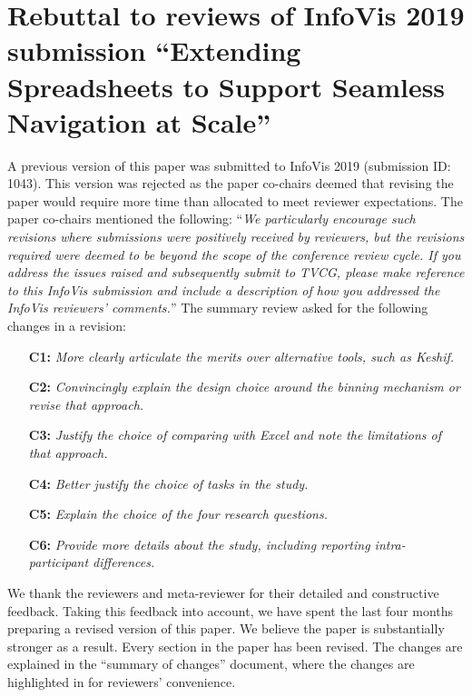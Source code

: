 
\section*{Rebuttal to reviews of InfoVis 2019 submission ``Extending Spreadsheets to Support Seamless
Navigation at Scale''}

A previous version of this paper was submitted to InfoVis 2019 (submission ID: 1043). This version was rejected as the paper co-chairs deemed that revising the paper would require more time than allocated to meet reviewer expectations. The paper co-chairs mentioned the following: ``\textit{We particularly encourage such revisions where submissions were positively received by reviewers, but the revisions required were deemed to be beyond the scope of the conference review cycle. If you address the issues raised and subsequently submit to TVCG, please make reference to this InfoVis submission and include a description of how you addressed the InfoVis reviewers' comments.}'' 
The summary review asked for the following changes in a revision:
\begin{itemize}
    \item[\textbf{C1:}] {\em More clearly articulate the merits over alternative tools, such as Keshif.} 
     \item[\textbf{C2:}] {\em Convincingly explain the design choice around the binning mechanism or revise
    that approach.}
    \item[\textbf{C3:}] {\em Justify the choice of comparing with Excel and note the limitations of that
    approach.}
     \item[\textbf{C4:}] {\em Better justify the choice of tasks in the study.} 
     \item[\textbf{C5:}]{\em Explain the choice of the four research questions.}
     \item[\textbf{C6:}] {\em Provide more details about the study, including reporting intra-participant
    differences.}
\end{itemize} 
We thank the reviewers and meta-reviewer for their detailed and
constructive feedback.
Taking this feedback into account, 
we have spent the last four months 
preparing a revised version of this paper.
We believe the paper is substantially
stronger as a result. 
Every section in the paper has been revised. The changes are explained in the ``summary of changes'' document, where
the changes are highlighted in  for reviewers' convenience.

